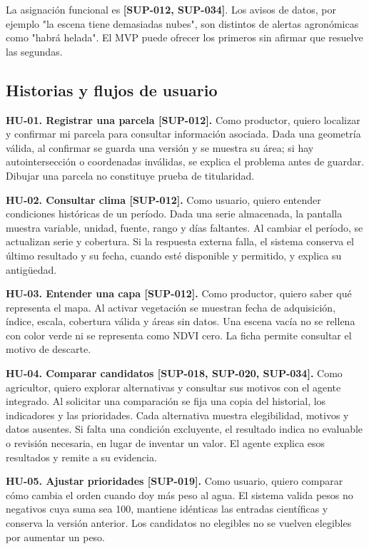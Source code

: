 \documentclass[10pt,a4paper]{article}
\begin{document}
La asignación funcional es \textbf{[SUP-012, SUP-034]}. Los avisos de datos, por ejemplo "la escena tiene demasiadas nubes", son distintos de alertas agronómicas como "habrá helada". El MVP puede ofrecer los primeros sin afirmar que resuelve las segundas.


\subsection{Historias y flujos de usuario}

\textbf{HU-01. Registrar una parcela [SUP-012].} Como productor, quiero localizar y confirmar mi parcela para consultar información asociada. Dada una geometría válida, al confirmar se guarda una versión y se muestra su área; si hay autointersección o coordenadas inválidas, se explica el problema antes de guardar. Dibujar una parcela no constituye prueba de titularidad.


\textbf{HU-02. Consultar clima [SUP-012].} Como usuario, quiero entender condiciones históricas de un período. Dada una serie almacenada, la pantalla muestra variable, unidad, fuente, rango y días faltantes. Al cambiar el período, se actualizan serie y cobertura. Si la respuesta externa falla, el sistema conserva el último resultado y su fecha, cuando esté disponible y permitido, y explica su antigüedad.


\textbf{HU-03. Entender una capa [SUP-012].} Como productor, quiero saber qué representa el mapa. Al activar vegetación se muestran fecha de adquisición, índice, escala, cobertura válida y áreas sin datos. Una escena vacía no se rellena con color verde ni se representa como NDVI cero. La ficha permite consultar el motivo de descarte.


\textbf{HU-04. Comparar candidatos [SUP-018, SUP-020, SUP-034].} Como agricultor, quiero explorar alternativas y consultar sus motivos con el agente integrado. Al solicitar una comparación se fija una copia del historial, los indicadores y las prioridades. Cada alternativa muestra elegibilidad, motivos y datos ausentes. Si falta una condición excluyente, el resultado indica no evaluable o revisión necesaria, en lugar de inventar un valor. El agente explica esos resultados y remite a su evidencia.


\textbf{HU-05. Ajustar prioridades [SUP-019].} Como usuario, quiero comparar cómo cambia el orden cuando doy más peso al agua. El sistema valida pesos no negativos cuya suma sea 100, mantiene idénticas las entradas científicas y conserva la versión anterior. Los candidatos no elegibles no se vuelven elegibles por aumentar un peso.
\end{document}

